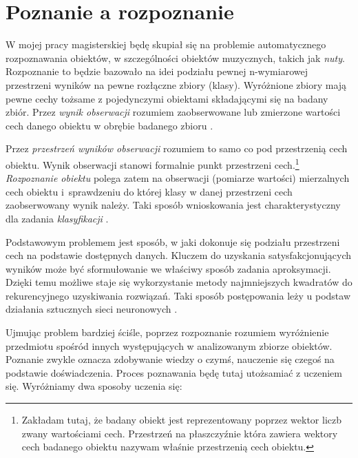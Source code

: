 
\clearpage
\section{Poznanie a rozpoznanie}
W mojej pracy magisterskiej będę skupiał się na problemie automatycznego rozpoznawania obiektów, w szczególności obiektów muzycznych, takich jak \textit{nuty}. Rozpoznanie to będzie  bazowało na idei podziału pewnej n-wymiarowej przestrzeni wyników na pewne rozłączne zbiory (klasy). Wyróżnione zbiory mają pewne cechy tożsame z pojedynczymi obiektami składającymi się na badany zbiór. Przez \textit{wynik obserwacji} rozumiem zaobserwowane lub zmierzone wartości cech danego obiektu w obrębie badanego zbioru \citep[s. 7]{Kwiatkowski2007}.

Przez \textit{przestrzeń wyników obserwacji} rozumiem to samo co pod przestrzenią cech obiektu. Wynik obserwacji stanowi formalnie punkt przestrzeni cech.\footnote{Zakładam tutaj, że badany obiekt jest reprezentowany poprzez wektor liczb zwany wartościami cech. Przestrzeń na płaszczyźnie która zawiera wektory cech badanego obiektu nazywam właśnie przestrzenią cech obiektu.} \textit{Rozpoznanie obiektu} polega zatem na obserwacji (pomiarze wartości) mierzalnych cech obiektu i~sprawdzeniu do której klasy w danej przestrzeni cech zaobserwowany wynik należy. Taki sposób wnioskowania jest charakterystyczny dla zadania \textit{klasyfikacji} \citep[s. 7]{Kwiatkowski2007}.

Podstawowym problemem jest sposób, w jaki dokonuje się podziału przestrzeni cech na podstawie dostępnych danych. Kluczem do uzyskania satysfakcjonujących wyników może być sformułowanie we właściwy sposób zadania aproksymacji. Dzięki temu możliwe staje się wykorzystanie metody najmniejszych kwadratów do rekurencyjnego uzyskiwania rozwiązań. Taki sposób postępowania leży u podstaw działania sztucznych sieci neuronowych \citep[s. 7-8]{Kwiatkowski2007}.

Ujmując problem bardziej ściśle, poprzez rozpoznanie rozumiem wyróżnienie przedmiotu spośród innych występujących w analizowanym zbiorze obiektów. Poznanie zwykle oznacza zdobywanie wiedzy o czymś, nauczenie się czegoś na podstawie doświadczenia. Proces poznawania będę tutaj utożsamiać z uczeniem się.
Wyróżniamy dwa sposoby uczenia się:

